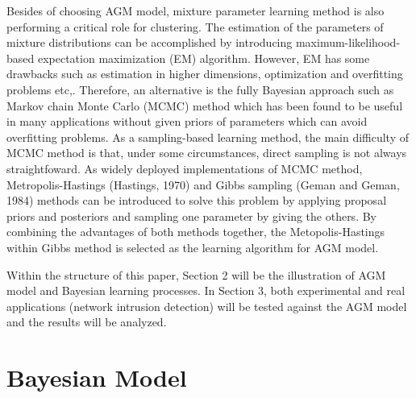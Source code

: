 \documentclass[conference]{llncs}
\begin{document}
Besides of choosing AGM model, mixture parameter learning method is also performing a critical role for clustering. The estimation of the parameters of mixture distributions can be accomplished by introducing maximum-likelihood-based expectation maximization (EM) \cite{b5} algorithm. However, EM has some drawbacks such as estimation in higher dimensions, optimization \cite{b6} and overfitting problems \cite{b7} etc,. Therefore, an alternative is the fully Bayesian approach such as Markov chain Monte Carlo (MCMC) method which has been found to be useful in many applications without given priors of parameters which can avoid overfitting problems. As a sampling-based learning method, the main difficulty of MCMC method is that, under some circumstances, direct sampling is not always straightfoward. As widely deployed implementations of MCMC method, Metropolis-Hastings (Hastings, 1970)\cite{b8} and Gibbs sampling (Geman and Geman, 1984)\cite{b9} methods can be introduced to solve this problem by applying proposal priors and posteriors and sampling one parameter by giving the others. By combining the advantages of both methods together, the Metopolis-Hastings within Gibbs method \cite{b6} is selected as the learning algorithm for AGM model.

Within the structure of this paper, Section 2 will be the illustration of AGM model and Bayesian learning processes. In Section 3, both experimental and real applications (network intrusion detection) will be tested against the AGM model and the results will be analyzed.

\section{Bayesian Model}
\end{document}

